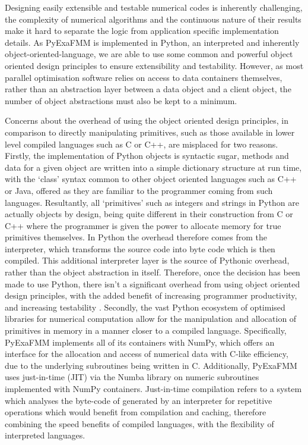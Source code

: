 Designing easily extensible and testable numerical codes is inherently challenging,
the complexity of numerical algorithms and the continuous nature of their results
make it hard to separate the logic from application specific implementation details.
As \gls{PyExaFMM} is implemented in Python, an \gls{interpreted} and inherently
\gls{object-oriented-language}, we are able to
use some common and powerful object oriented design principles to ensure extensibility
and testability. However, as most parallel optimisation software relies on access to data
containers themselves, rather than an abstraction layer between a data object
and a client object, the number of object abstractions must also be kept to a
minimum.

Concerns about the overhead of using the object oriented design principles, in comparison to directly manipulating
primitives, such as those available in lower level compiled languages such as C
or C++, are misplaced for two reasons. Firstly, the implementation of Python objects
is syntactic sugar, methods and data for a given object are written into
a simple dictionary structure at run time, with the `class' syntax common to other
object oriented languages such as C++ or Java, offered as they are familiar to
the programmer coming from such languages. Resultantly, all `primitives' such as
integers and strings in Python are actually objects by design, being quite different
in their construction from C or C++ where the programmer is given the power to
allocate memory for true primitives themselves. In Python the overhead therefore
comes from the interpreter, which transforms the source code into byte code which
is then compiled. This additional interpreter layer is the source of Pythonic overhead,
rather than the object abstraction in itself. Therefore, once the decision has
been made to use Python, there isn't a significant overhead from using object
oriented design principles, with the added benefit of increasing programmer
productivity, and increasing testability \cite{Ramalho:2015:Oreilly}. Secondly,
the vast Python ecosystem of optimised libraries for numerical computation allow
for the manipulation and allocation of primitives in memory in a manner closer to a compiled language.
Specifically, \gls{PyExaFMM} implements all of its containers with NumPy, which
offers an interface for the allocation and access of numerical data with C-like
efficiency, due to the underlying subroutines being written in C. Additionally,
\gls{PyExaFMM} uses just-in-time (\gls{JIT}) via the Numba library on
numeric subroutines implemented with NumPy containers. Just-in-time compilation
refers to a system which analyses the byte-code of generated by an interpreter
for repetitive operations which would benefit from compilation and caching, therefore
combining the speed benefits of compiled languages, with the flexibility of interpreted
languages.

